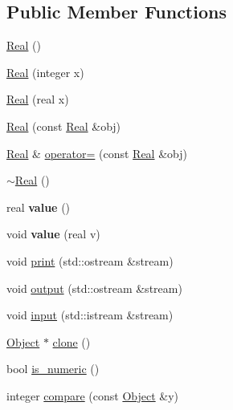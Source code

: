 \subsection*{Public Member Functions}
\begin{DoxyCompactItemize}
\item 
\hyperlink{classez_1_1objects_1_1Real_a5945b83ed15c1c3ffd1897d3837dcdf5}{Real} ()
\item 
\hyperlink{classez_1_1objects_1_1Real_a668ea8f5e35a799369ad4bfd47d74faf}{Real} (integer x)
\item 
\hyperlink{classez_1_1objects_1_1Real_a9be0aa85761e846668e2a2d0342e95a7}{Real} (real x)
\item 
\hyperlink{classez_1_1objects_1_1Real_a9c7aad24c40817f4f8417b625326390d}{Real} (const \hyperlink{classez_1_1objects_1_1Real}{Real} \&obj)
\item 
\hyperlink{classez_1_1objects_1_1Real}{Real} \& \hyperlink{classez_1_1objects_1_1Real_a3931028d4fe7f358321819d38679ebe2}{operator=} (const \hyperlink{classez_1_1objects_1_1Real}{Real} \&obj)
\item 
\hyperlink{classez_1_1objects_1_1Real_abf8d708ad4242b393ca580cc330e925e}{$\sim$\+Real} ()
\item 
\mbox{\label{classez_1_1objects_1_1Real_a5c3ef26d904f6d358cdf9027e4dad62b}} 
real {\bfseries value} ()
\item 
\mbox{\label{classez_1_1objects_1_1Real_a998700292848647ac334bae2eff906e4}} 
void {\bfseries value} (real v)
\item 
void \hyperlink{classez_1_1objects_1_1Real_ab41c52af3b10d8cd5190317fc1d70d85}{print} (std\+::ostream \&stream)
\item 
void \hyperlink{classez_1_1objects_1_1Real_a337dff4013876656aeb1aa98ecc9864b}{output} (std\+::ostream \&stream)
\item 
void \hyperlink{classez_1_1objects_1_1Real_a89711c886a9569409c7d17530b97bcc5}{input} (std\+::istream \&stream)
\item 
\hyperlink{classez_1_1objects_1_1Object}{Object} $\ast$ \hyperlink{classez_1_1objects_1_1Real_a709e5a1bf422673b1b27d4d9d58de4b5}{clone} ()
\item 
bool \hyperlink{classez_1_1objects_1_1Real_a3b215250b4df60c975bc378792b115b4}{is\+\_\+numeric} ()
\item 
integer \hyperlink{classez_1_1objects_1_1Real_ab5876f5ce73db15906113a2651453eca}{compare} (const \hyperlink{classez_1_1objects_1_1Object}{Object} \&y)

\end{DoxyCompactItemize}
